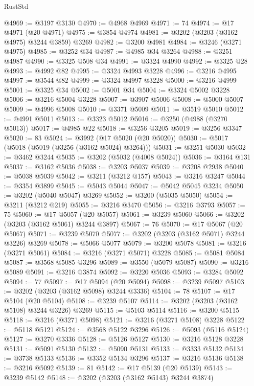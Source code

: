 \begin{lexlean}{RustStd}
\begin{coremodule}
@4969 := @3197 @3130
@4970 := @4968 @4969
@4971 := 74
@4974 := @17 @4971 (@20 @4971)
@4975 := @3854 @4974
@4981 := @3202 (@3203 (@3162 @4975) @3244 @3859) @3269
@4982 := @3200 @4981
@4984 := @3246 (@3271 @4975)
@4985 := @3252 @34
@4987 := @4985 @34 @3264
@4988 := @3251 @4987
@4990 := @3325 @508 @34
@4991 := @3324 @4990
@4992 := @3325 @28
@4993 := @4992 @82
@4995 := @3324 @4993 @3228
@4996 := @3216 @4995
@4997 := @3544 @82
@4999 := @3324 @4997 @3228
@5000 := @3216 @4999
@5001 := @3325 @34
@5002 := @5001 @34
@5004 := @3324 @5002 @3228
@5006 := @3216 @5004 @3228
@5007 := @3907 @5006
@5008 := @5000 @5007
@5009 := @4996 @5008
@5010 := @3371 @5009
@5011 := @3519 @5010
@5012 := @4991 @5011
@5013 := @3323 @5012
@5016 := @3250 (@4988 (@3270 @5013))
@5017 := @4985 @22
@5018 := @3256 @3205
@5019 := @3256 @3347
@5020 := 83
@5024 := @3992 (@17 @5020 (@20 @5020))
@5030 := @5017 (@5018 (@5019 (@3256 (@3162 @5024) @3264)))
@5031 := @3251 @5030
@5032 := @3462 @3244
@5035 := @3202 (@5032 (@4008 @5024))
@5036 := @3164 @131
@5037 := @3162 @5036
@5038 := @3203 @5037
@5039 := @3208 @2938
@5040 := @5038 @5039
@5042 := @3211 (@3212 @157)
@5043 := @3216 @3247
@5044 := @3354 @3899
@5045 := @5043 @5044
@5047 := @5042 @5045 @3234
@5050 := @3202 (@5040 @5047) @3269
@5052 := @3200 (@5035 @5050)
@5054 := @3211 (@3212 @219)
@5055 := @3216 @3470
@5056 := @3216 @3793
@5057 := 75
@5060 := @17 @5057 (@20 @5057)
@5061 := @3239 @5060
@5066 := @3202 (@3203 (@3162 @5061) @3244 @3897)
@5067 := 76
@5070 := @17 @5067 (@20 @5067)
@5071 := @3239 @5070
@5077 := @3202 (@3203 (@3162 @5071) @3244 @3226) @3269
@5078 := @5066 @5077
@5079 := @3200 @5078
@5081 := @3216 (@3271 @5061)
@5084 := @3216 (@3271 @5071) @3228
@5085 := @5081 @5084
@5087 := @3568 @5085 @3296
@5089 := @3550 (@5079 @5087)
@5090 := @3216 @5089
@5091 := @3216 @3874
@5092 := @3220 @5036
@5093 := @3284 @5092
@5094 := 77
@5097 := @17 @5094 (@20 @5094)
@5098 := @3239 @5097
@5103 := @3202 (@3203 (@3162 @5098) @3244 @3336)
@5104 := 78
@5107 := @17 @5104 (@20 @5104)
@5108 := @3239 @5107
@5114 := @3202 (@3203 (@3162 @5108) @3244 @3226) @3269
@5115 := @5103 @5114
@5116 := @3200 @5115
@5118 := @3216 (@3271 @5098)
@5121 := @3216 (@3271 @5108) @3228
@5122 := @5118 @5121
@5124 := @3568 @5122 @3296
@5126 := @5093 (@5116 @5124)
@5127 := @3270 @3336
@5128 := @5126 @5127
@5130 := @3216 @5128 @3228
@5131 := @5091 @5130
@5132 := @5090 @5131
@5133 := @3333 @5132
@5134 := @3738 @5133
@5136 := @3352 @5134 @3296
@5137 := @3216 @5136
@5138 := @3216 @5092
@5139 := 81
@5142 := @17 @5139 (@20 @5139)
@5143 := @3239 @5142
@5148 := @3202 (@3203 (@3162 @5143) @3244 @3874)

\end{coremodule}
\end{lexlean}
